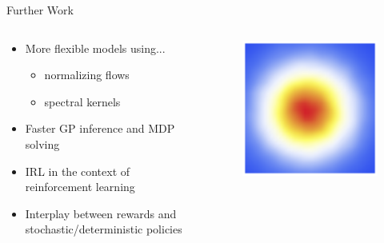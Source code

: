\documentclass{beamer}
\begin{document}
\begin{frame}{Further Work}
  \begin{minipage}[t]{\textwidth}
    \begin{columns}[t]
      \begin{column}{0.9\textwidth}
        \begin{itemize}
        \item More flexible models using...
          \begin{itemize}
          \item normalizing flows
          \item spectral kernels
          \end{itemize}
        \item Faster GP inference and MDP solving
        \item IRL in the context of reinforcement learning
        \item Interplay between rewards and stochastic/deterministic policies
        \end{itemize}
        \vspace{2.5cm}
      \end{column}
      \begin{column}{0.1\textwidth}
        \vspace{-1cm}
        \begin{figure}
          \centering
          \includegraphics[scale=0.1]{images/flows-1.png}


\end{figure}
\end{column}
\end{columns}
\end{minipage}
\end{frame}
\end{document}
